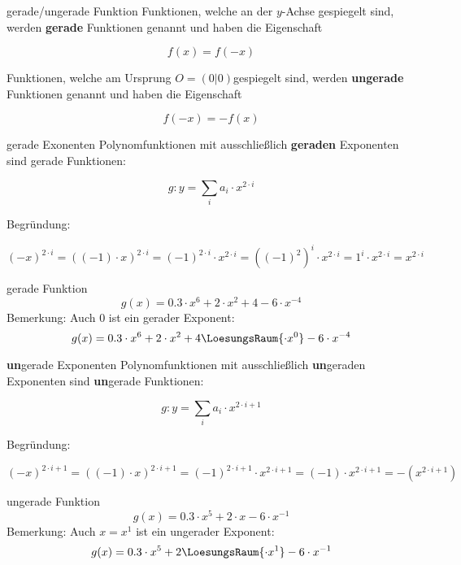 \begin{definition}{gerade/ungerade Funktion}{}
  Funktionen, welche an der $y$-Achse gespiegelt sind, werden
  \textbf{gerade} Funktionen genannt und haben die Eigenschaft

  $$f(x) = f(-x)$$

  
  Funktionen, welche am Ursprung $O = (0|0)$gespiegelt sind, werden
  \textbf{ungerade} Funktionen genannt und haben die Eigenschaft

  $$f(-x) = -f(x)$$
\end{definition}


\begin{gesetz}{gerade Exonenten}{}
  Polynomfunktionen mit ausschließlich \textbf{geraden} Exponenten sind gerade Funktionen:

  $$g: y= \sum_i a_i\cdot{}x^{2\cdot{}i}$$

  Begründung:

  $$(-x)^{2\cdot{}i} = ((-1)\cdot{}x)^{2\cdot{}i} = (-1)^{2\cdot{}i} \cdot{} x^{2\cdot{}i} = \left((-1)^2\right)^i \cdot{} x^{2\cdot{}i} = 1^i\cdot{}x^{2\cdot{}i} = x^{2\cdot{}i}$$
\end{gesetz}

\begin{beispiel}{gerade Funktion}{}
  $$g(x) = 0.3\cdot{}x^6 + 2\cdot{}x^2 + 4 -6\cdot{}x^{-4}$$
  Bemerkung: Auch $0$ ist ein gerader Exponent:
  $$g(x) = 0.3\cdot{}x^6 + 2\cdot{}x^2 + 4\LoesungsRaum{\cdot{}x^0} -6\cdot{}x^{-4}$$  
\end{beispiel}
\newpage


\begin{gesetz}{\textbf{un}gerade Exponenten}{}
  Polynomfunktionen mit ausschließlich \textbf{un}geraden Exponenten sind \textbf{un}gerade Funktionen:

  $$g: y= \sum_i a_i\cdot{}x^{2\cdot{}i+1}$$

  Begründung:

  $$(-x)^{2\cdot{}i + 1} = ((-1)\cdot{}x)^{2\cdot{}i+1} = (-1)^{2\cdot{}i+1} \cdot{} x^{2\cdot{}i+1} = (-1)\cdot{}x^{2\cdot{}i+1} = -\left(x^{2\cdot{}i+1}\right)$$

\end{gesetz}

\begin{beispiel}{ungerade Funktion}{}
  $$g(x) = 0.3\cdot{}x^5 + 2\cdot{}x  -6\cdot{}x^{-1}$$
  Bemerkung: Auch $x=x^1$ ist ein ungerader Exponent:
  $$g(x) = 0.3\cdot{}x^5 + 2\LoesungsRaum{\cdot{}x^1} -6\cdot{}x^{-1}$$  
\end{beispiel}



